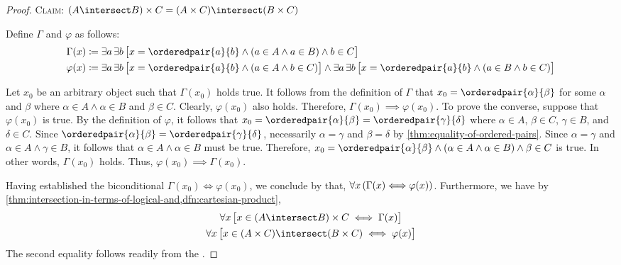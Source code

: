 \begin{proof}
    \vspace{0.5cm}
    \noindent
    {\scshape Claim}: \( \mleft( A \intersect B \mright) \times C = \mleft( A \times C \mright) \intersect \mleft( B \times C \mright) \)

    \vspace{0.1cm}
    \noindent
    Define \( \Gamma \) and \( \varphi \) as follows:
    \begin{align*}
        \Gamma(x)
        &\coloneq
        \exists a \, \exists b \, \big[ x = \orderedpair{a}{b} \land \mleft( a \in A \land a \in B \mright) \land b \in C \big] \\
        \varphi(x)
        &\coloneq
        \exists a \, \exists b \, \big[ x = \orderedpair{a}{b} \land \mleft( a \in A \land b \in C \mright) \big]
        \land
        \exists a \, \exists b \, \big[ x = \orderedpair{a}{b} \land \mleft( a \in B \land b \in C \mright) \big]
    \end{align*}
   
    \noindent
    Let \( x_{0} \) be an arbitrary object such that \( \Gamma(x_{0}) \) holds true. It follows from the definition of \( \Gamma \)
    that \( x_{0} = \orderedpair{\alpha}{\beta} \) for some \( \alpha \) and \( \beta \) where \( \alpha \in A \land \alpha \in B \)
    and \( \beta \in C \). Clearly, \( \varphi(x_{0}) \) also holds. Therefore, \( \Gamma(x_{0}) {\implies} \varphi(x_{0}) \). To prove
    the converse, suppose that \( \varphi(x_{0}) \) is true. By the definition of \( \varphi \),
    it follows that \( x_{0} = \orderedpair{\alpha}{\beta} = \orderedpair{\gamma}{\delta}\) where \( \alpha \in A \), \( \beta \in C \),
    \( \gamma \in B \), and \( \delta \in C \). Since \( \orderedpair{\alpha}{\beta} = \orderedpair{\gamma}{\delta} \), necessarily
    \( \alpha = \gamma \) and \( \beta = \delta \) by \cref{thm:equality-of-ordered-pairs}. Since \( \alpha = \gamma \) and
    \( \alpha \in A \land \gamma \in B \), it follows that \( \alpha \in A \land \alpha \in B \) must be true. Therefore,
    \( x_{0} = \orderedpair{\alpha}{\beta} \land (\alpha \in A \land \alpha \in B) \land \beta \in C \) is true. In other words,
    \( \Gamma(x_{0}) \) holds. Thus, \( \varphi(x_{0}) {\implies} \Gamma(x_{0}) \).
    
    \vspace{0.2cm}
    \noindent
    Having established the biconditional \( \Gamma(x_{0}) {\iff} \varphi(x_{0}) \), we conclude by  that,
    \( \forall x \, \mleft( \Gamma(x) {\iff} \varphi(x) \mright) \).
    Furthermore, we have by \cref{thm:intersection-in-terms-of-logical-and,dfn:cartesian-product},
    \begin{gather*}
        \forall x \, \big[ x \in \mleft( A \intersect B \mright) \times C \iff \Gamma(x) \big] \\
        \forall x \, \big[ x \in \mleft( A \times C \mright) \intersect \mleft( B \times C \mright) \iff \varphi(x) \big]
    \end{gather*}
    The second equality follows readily from the .


\end{proof}
